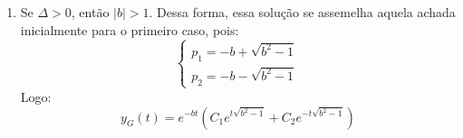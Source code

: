 \begin{enumerate}[I]
    \item Se $\Delta > 0$, então $|b| > 1$. Dessa forma, essa solução se assemelha aquela achada inicialmente para o primeiro caso, pois:
    \begin{equation*}
         \begin{cases}
            p_1 = -b + \sqrt{b^2-1}\\
            p_2 = -b - \sqrt{b^2-1}
        \end{cases}
    \end{equation*}
    Logo:
    \begin{equation*}
       \boxed{ y_G(t) =  e^{-bt}(C_1e^{t\sqrt{b^2-1}} + C_2e^{-t\sqrt{b^2-1}})}
    \end{equation*}
\end{enumerate}